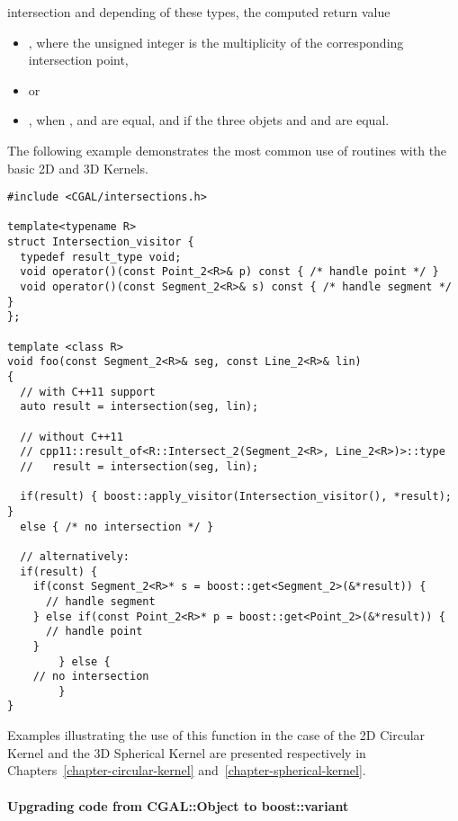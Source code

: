 \begin{ccRefFunction}{intersection}
and depending of these types, the computed return value
\begin{itemize}
\item {} ,
where the unsigned integer is the multiplicity of the corresponding
intersection point,
\item {}  or
\item {} , when ,  and 
 are equal, and if the three objets  and  
and  are equal.
\end{itemize} 

\ccExample

The following example demonstrates the most common use of 
 routines with the basic 2D and 3D Kernels.
\ccHtmlLinksOff%
\begin{verbatim}
#include <CGAL/intersections.h>

template<typename R>
struct Intersection_visitor {
  typedef result_type void;
  void operator()(const Point_2<R>& p) const { /* handle point */ }
  void operator()(const Segment_2<R>& s) const { /* handle segment */ }
};

template <class R>
void foo(const Segment_2<R>& seg, const Line_2<R>& lin)
{
  // with C++11 support
  auto result = intersection(seg, lin);

  // without C++11
  // cpp11::result_of<R::Intersect_2(Segment_2<R>, Line_2<R>)>::type 
  //   result = intersection(seg, lin);

  if(result) { boost::apply_visitor(Intersection_visitor(), *result); } 
  else { /* no intersection */ }

  // alternatively:
  if(result) {
    if(const Segment_2<R>* s = boost::get<Segment_2>(&*result)) {
      // handle segment
    } else if(const Point_2<R>* p = boost::get<Point_2>(&*result)) {
      // handle point
    }
        } else {
    // no intersection
        }
}
\end{verbatim}%
\ccHtmlLinksOn%

Examples illustrating the use of this function in the case of the 2D
Circular Kernel and the 3D Spherical Kernel are presented respectively
in Chapters~\ref{chapter-circular-kernel}
and~\ref{chapter-spherical-kernel}.

\paragraph{Upgrading code from CGAL::Object to boost::variant}


\end{ccRefFunction}
